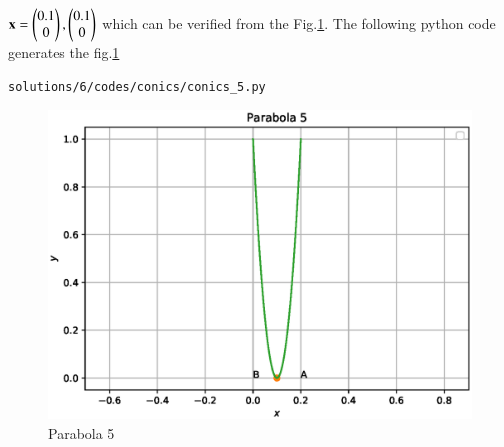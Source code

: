 \begin{enumerate}
$\mathbf{x}= \begin{pmatrix}0.1\\0\end{pmatrix}, \begin{pmatrix}0.1\\0\end{pmatrix}$
which can be verified from the Fig.\ref{fig:5.2.6_parabola_5}.
The following python code generates the fig.\ref{fig:5.2.6_parabola_5}
\begin{lstlisting}
solutions/6/codes/conics/conics_5.py
\end{lstlisting}
\begin{figure}[!ht]
\includegraphics[width=\columnwidth]{./solutions/6/codes/conics/conics_5.eps}
\caption{Parabola 5}
\label{fig:5.2.6_parabola_5}
\end{figure} 

\end{enumerate}

